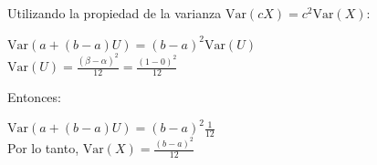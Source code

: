 \documentclass[11pt,a4paper]{report}
\begin{document}
\begin{enumerate}
{\begin{enumerate}
{					Utilizando la propiedad de la varianza $\text{Var}(cX) = c^2\text{Var}(X)$:
					
					$\text{Var}(a+(b - a)U) = (b - a)^2 \text{Var}(U)$\\
					
									
					$\text{Var}(U) = \frac{(\beta - \alpha)^2}{12} = \frac{(1-0)^2}{12}$
					
					Entonces:
					
					$\text{Var}(a+(b - a)U) = (b - a)^2\frac{1}{12}$ \\

					
					Por lo tanto, $\text{Var}(X) = \frac{(b - a)^2}{12}$ \\
				}
			\end{enumerate}
			}
	\end{enumerate}
\end{document}
